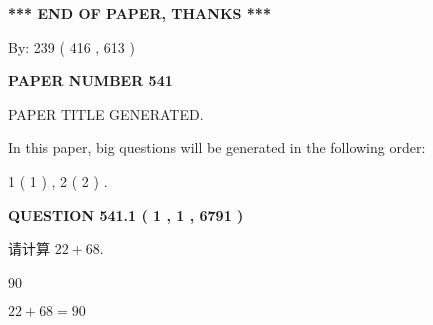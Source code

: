 \documentclass{ctexart}
\begin{document}
   
   
   
\vspace{1.0in} 
{\textbf{\large{ *** END OF PAPER, THANKS *** }}} 
   
   
\hspace{1.0in} By: 
 239 ( 416 ,  613 )
   
   
   
   
\newpage 
\setcounter{page}{ 
   541001 } 
   
   
   
   
 {\textbf{ \Large{ PAPER NUMBER  541  }}}
   
   
\vspace{0.2in}
   
   
   
   
   
   
   
   
 \vspace{0.2in}
 
 
 
 
   
   
 PAPER TITLE GENERATED.
   
   
   
\vspace{0.2in}
   
In this paper, big questions will be generated in the following order: 
   
   
   1 ( 1 )
 ,
   2 ( 2 )
 .
  
\vspace{0.2in}
  
{\textbf{\Large{QUESTION
541.1 
 ( 1 , 1 , 6791 )
}}}
  
  
 
请计算 $ %
22 +  %
68 $.
 
 
 
\noindent{}
 
 

90
 
 
\noindent{}
 
 

 
 
 
\noindent{}
 
 

$ %
22 +  %
68=   %
90$
 
\end{document}

